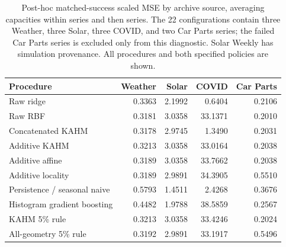 \begin{table}[!htbp]
\centering\small\setlength{\tabcolsep}{4pt}
\caption{Post-hoc matched-success scaled MSE by archive source, averaging capacities within series and then series. The 22 configurations contain three Weather, three Solar, three COVID, and two Car Parts series; the failed Car Parts series is excluded only from this diagnostic. Solar Weekly has simulation provenance. All procedures and both specified policies are shown.}
\label{tab:utility-archive-sources}
\begin{tabular}{lrrrr}
\toprule
Procedure & Weather & Solar & COVID & Car Parts \\
\midrule
Raw ridge & 0.3363 & 2.1992 & 0.6404 & 0.2106 \\
Raw RBF & 0.3181 & 3.0358 & 33.1371 & 0.2010 \\
Concatenated KAHM & 0.3178 & 2.9745 & 1.3490 & 0.2031 \\
Additive KAHM & 0.3213 & 3.0358 & 33.0164 & 0.2038 \\
Additive affine & 0.3189 & 3.0358 & 33.7662 & 0.2038 \\
Additive locality & 0.3189 & 2.9891 & 34.3905 & 0.5510 \\
Persistence / seasonal naive & 0.5793 & 1.4511 & 2.4268 & 0.3676 \\
Histogram gradient boosting & 0.4482 & 1.9788 & 38.5859 & 0.2567 \\
KAHM 5\% rule & 0.3213 & 3.0358 & 33.4246 & 0.2024 \\
All-geometry 5\% rule & 0.3192 & 2.9891 & 33.1917 & 0.5496 \\
\bottomrule
\end{tabular}
\end{table}
